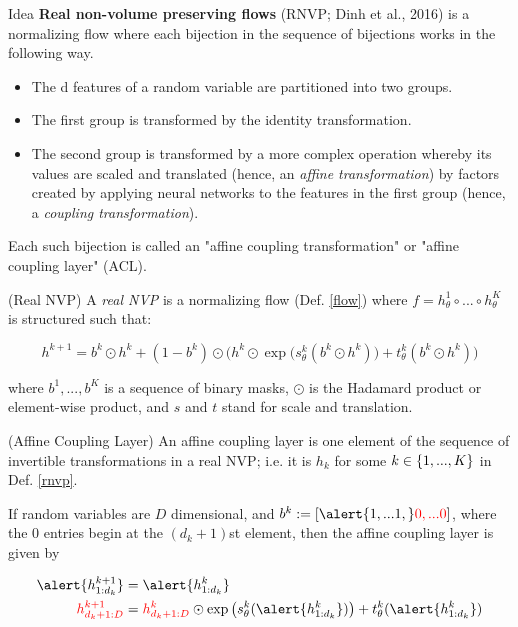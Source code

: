 \documentclass[10pt]{beamer}
\begin{document}
\begin{frame}{Idea}
 \textbf{Real non-volume preserving flows} (RNVP; Dinh et al., 2016) is a normalizing flow where  each bijection in the sequence of bijections works in the following way. 
 
 \begin{itemize}
 \item The d features of a random variable are partitioned into two groups.  
 \item The first  group is transformed by the identity transformation.
 \item The second group is transformed by a more complex operation whereby its values are scaled and translated (hence, an \textit{affine transformation}) by factors created by applying neural networks to the features in the first group (hence, a \textit{coupling transformation}). 
 \end{itemize}
\vfill
Each such bijection is called an "affine coupling transformation" or "affine coupling layer" (ACL).
\end{frame}


\begin{frame}
\begin{definition}{(Real NVP)} \label{rnvp}
A \textit{real NVP} is a normalizing flow (Def. \ref{flow}) where $f=h_\theta^1 \circ ... \circ h_\theta^K$ is structured such that:

\[h^{k+1} = b^k \odot h^k + (1-b^k) \odot \bigg( h^k \odot \exp \big( s^k_\theta(b^k \odot h^k) \big) + t^k _\theta(b^k \odot h^k ) \bigg)  \]
 
where $b^1, ..., b^K$ is a sequence of binary masks, $\odot$ is the Hadamard product or element-wise product, and $s$ and $t$ stand for scale and translation. %
\end{definition}


\begin{definition}{(Affine Coupling Layer)} \label{acl}
An affine coupling layer is one element of the sequence of invertible transformations in a real NVP; i.e. it is $h_k $ for some $k  \in \{ {1,...,K} \}$ in Def. \ref{rnvp}. 
\end{definition}
\end{frame}

\begin{frame}
\begin{example}\label{rnvp_example}

If random variables are $D$ dimensional, and $b^k := [\alert{1,... 1,} \red{ 0,...0}]$, where the 0 entries begin at the $(d_{k}+1)$st element, then the affine coupling layer is given by

\begin{align*}
\alert{h^{k+1}_{1:d_k}} &= \alert{h^k_{1:d_k}} \\
\red{h^{k+1}_{d_k+1:D}} &= \red{h^k_{d_k+1:D}} \odot \exp \big( s^k_\theta(\alert{h^k_{1:d_k}}) \big) + t^k_\theta(\alert{h^k_{1:d_k}})  \\
\end{align*}

\end{example}
\end{frame}
\end{document}
